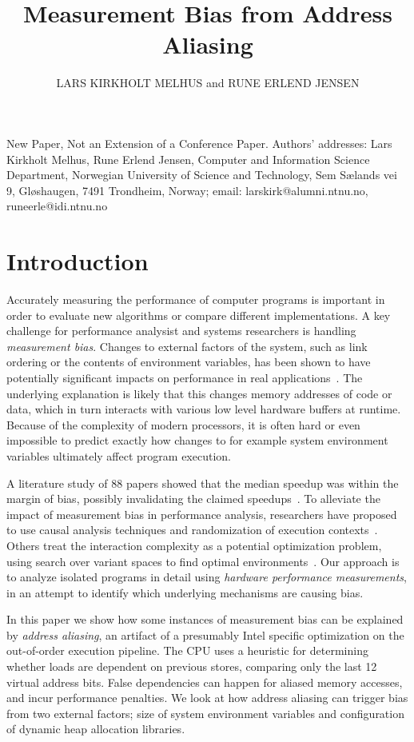 \documentclass[prodmode,acmtaco]{acmsmall}
\title{Measurement Bias from Address Aliasing}
\author{
LARS KIRKHOLT MELHUS and RUNE ERLEND JENSEN
  \affil{Norwegian University of Science and Technology}}
\begin{document}
\begin{bottomstuff}
New Paper, Not an Extension of a Conference Paper.
Authors' addresses: Lars Kirkholt Melhus, Rune Erlend Jensen, Computer and Information Science Department, Norwegian University of Science and Technology, 
Sem S{\ae}lands vei 9, Gl{\o}shaugen, 7491 Trondheim, Norway; email: larskirk@alumni.ntnu.no, runeerle@idi.ntnu.no
\end{bottomstuff}

\maketitle


\section{Introduction}
Accurately measuring the performance of computer programs is important in order to evaluate new algorithms or compare different implementations.
A key challenge for performance analysist and systems researchers is handling \emph{measurement bias}.
Changes to external factors of the system, such as link ordering or the contents of environment variables, has been shown to have potentially significant impacts on performance in real applications~\cite{Mytkowicz:2009:WrongData}.
The underlying explanation is likely that this changes memory addresses of code or data, which in turn interacts with various low level hardware buffers at runtime.
Because of the complexity of modern processors, it is often hard or even impossible to predict exactly how changes to for example system environment variables ultimately affect program execution.

A literature study of 88 papers showed that the median speedup was within the margin of bias, possibly invalidating the claimed speedups~\cite{Mytkowicz:2008:OE&MB}. 
To alleviate the impact of measurement bias in performance analysis, researchers have proposed to use causal analysis techniques and randomization of execution contexts~\cite{Mytkowicz:2008:OE&MB}.
Others treat the interaction complexity as a potential optimization problem, using search over variant spaces to find optimal environments~\cite{Knights:2009:BlindOpt}.
Our approach is to analyze isolated programs in detail using \emph{hardware performance measurements}, in an attempt to identify which underlying mechanisms are causing bias.

In this paper we show how some instances of measurement bias can be explained by \emph{address aliasing}, an artifact of a presumably Intel specific optimization on the out-of-order execution pipeline.
The CPU uses a heuristic for determining whether loads are dependent on previous stores, comparing only the last 12 virtual address bits.
False dependencies can happen for aliased memory accesses, and incur performance penalties.
We look at how address aliasing can trigger bias from two external factors; size of system environment variables and configuration of dynamic heap allocation libraries.
\end{document}
